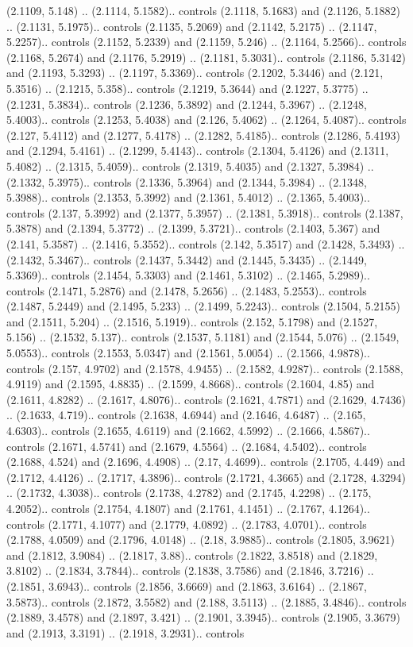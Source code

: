 (2.1109, 5.148) .. (2.1114, 5.1582).. controls (2.1118, 5.1683) and (2.1126, 5.1882) .. (2.1131, 5.1975).. controls (2.1135, 5.2069) and (2.1142, 5.2175) .. (2.1147, 5.2257).. controls (2.1152, 5.2339) and (2.1159, 5.246) .. (2.1164, 5.2566).. controls (2.1168, 5.2674) and (2.1176, 5.2919) .. (2.1181, 5.3031).. controls (2.1186, 5.3142) and (2.1193, 5.3293) .. (2.1197, 5.3369).. controls (2.1202, 5.3446) and (2.121, 5.3516) .. (2.1215, 5.358).. controls (2.1219, 5.3644) and (2.1227, 5.3775) .. (2.1231, 5.3834).. controls (2.1236, 5.3892) and (2.1244, 5.3967) .. (2.1248, 5.4003).. controls (2.1253, 5.4038) and (2.126, 5.4062) .. (2.1264, 5.4087).. controls (2.127, 5.4112) and (2.1277, 5.4178) .. (2.1282, 5.4185).. controls (2.1286, 5.4193) and (2.1294, 5.4161) .. (2.1299, 5.4143).. controls (2.1304, 5.4126) and (2.1311, 5.4082) .. (2.1315, 5.4059).. controls (2.1319, 5.4035) and (2.1327, 5.3984) .. (2.1332, 5.3975).. controls (2.1336, 5.3964) and (2.1344, 5.3984) .. (2.1348, 5.3988).. controls (2.1353, 5.3992) and (2.1361, 5.4012) .. (2.1365, 5.4003).. controls (2.137, 5.3992) and (2.1377, 5.3957) .. (2.1381, 5.3918).. controls (2.1387, 5.3878) and (2.1394, 5.3772) .. (2.1399, 5.3721).. controls (2.1403, 5.367) and (2.141, 5.3587) .. (2.1416, 5.3552).. controls (2.142, 5.3517) and (2.1428, 5.3493) .. (2.1432, 5.3467).. controls (2.1437, 5.3442) and (2.1445, 5.3435) .. (2.1449, 5.3369).. controls (2.1454, 5.3303) and (2.1461, 5.3102) .. (2.1465, 5.2989).. controls (2.1471, 5.2876) and (2.1478, 5.2656) .. (2.1483, 5.2553).. controls (2.1487, 5.2449) and (2.1495, 5.233) .. (2.1499, 5.2243).. controls (2.1504, 5.2155) and (2.1511, 5.204) .. (2.1516, 5.1919).. controls (2.152, 5.1798) and (2.1527, 5.156) .. (2.1532, 5.137).. controls (2.1537, 5.1181) and (2.1544, 5.076) .. (2.1549, 5.0553).. controls (2.1553, 5.0347) and (2.1561, 5.0054) .. (2.1566, 4.9878).. controls (2.157, 4.9702) and (2.1578, 4.9455) .. (2.1582, 4.9287).. controls (2.1588, 4.9119) and (2.1595, 4.8835) .. (2.1599, 4.8668).. controls (2.1604, 4.85) and (2.1611, 4.8282) .. (2.1617, 4.8076).. controls (2.1621, 4.7871) and (2.1629, 4.7436) .. (2.1633, 4.719).. controls (2.1638, 4.6944) and (2.1646, 4.6487) .. (2.165, 4.6303).. controls (2.1655, 4.6119) and (2.1662, 4.5992) .. (2.1666, 4.5867).. controls (2.1671, 4.5741) and (2.1679, 4.5564) .. (2.1684, 4.5402).. controls (2.1688, 4.524) and (2.1696, 4.4908) .. (2.17, 4.4699).. controls (2.1705, 4.449) and (2.1712, 4.4126) .. (2.1717, 4.3896).. controls (2.1721, 4.3665) and (2.1728, 4.3294) .. (2.1732, 4.3038).. controls (2.1738, 4.2782) and (2.1745, 4.2298) .. (2.175, 4.2052).. controls (2.1754, 4.1807) and (2.1761, 4.1451) .. (2.1767, 4.1264).. controls (2.1771, 4.1077) and (2.1779, 4.0892) .. (2.1783, 4.0701).. controls (2.1788, 4.0509) and (2.1796, 4.0148) .. (2.18, 3.9885).. controls (2.1805, 3.9621) and (2.1812, 3.9084) .. (2.1817, 3.88).. controls (2.1822, 3.8518) and (2.1829, 3.8102) .. (2.1834, 3.7844).. controls (2.1838, 3.7586) and (2.1846, 3.7216) .. (2.1851, 3.6943).. controls (2.1856, 3.6669) and (2.1863, 3.6164) .. (2.1867, 3.5873).. controls (2.1872, 3.5582) and (2.188, 3.5113) .. (2.1885, 3.4846).. controls (2.1889, 3.4578) and (2.1897, 3.421) .. (2.1901, 3.3945).. controls (2.1905, 3.3679) and (2.1913, 3.3191) .. (2.1918, 3.2931).. controls 